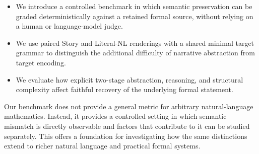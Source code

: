 \documentclass{article}
\begin{document}
\begin{itemize}
    \item We introduce a controlled benchmark in which semantic preservation
    can be graded deterministically against a retained formal source, without
    relying on a human or language-model judge.

    \item We use paired Story and Literal-NL renderings with a shared minimal
    target grammar to distinguish the additional difficulty of narrative
    abstraction from target encoding.

    \item We evaluate how explicit two-stage abstraction, reasoning, and
    structural complexity affect faithful recovery of the underlying formal
    statement.
\end{itemize}

Our benchmark does not provide a general metric for arbitrary
natural-language mathematics. Instead, it provides a controlled setting in
which semantic mismatch is directly observable and factors that contribute to
it can be studied separately. This offers a foundation for investigating how
the same distinctions extend to richer natural language and practical formal
systems.




\end{document}
